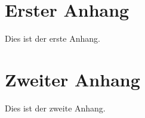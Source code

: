 \chapter{Erster Anhang}
Dies ist der erste Anhang.

\chapter{Zweiter Anhang}
Dies ist der zweite Anhang.

\clearpage
